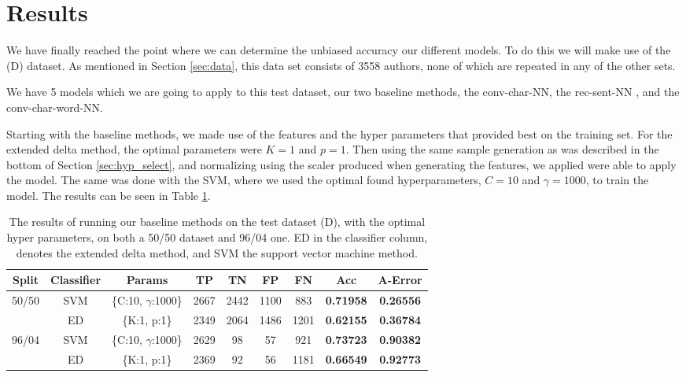 \section{Results} \label{sec:results}

We have finally reached the point where we can determine the unbiased accuracy
our different models. To do this we will make use of the (D) dataset. As
mentioned in Section \ref{sec:data}, this data set consists of 3558 authors,
none of which are repeated in any of the other sets.

We have 5 models which we are going to apply to this test dataset, our
two baseline methods, the \gls{conv-char-NN}, the \gls{rec-sent-NN} , and the
\gls{conv-char-word-NN}.

Starting with the baseline methods, we made use of the features and the
hyper parameters that provided best on the training set. For the extended
delta method, the optimal parameters were $K=1$ and $p = 1$. Then using
the same sample generation as was described in the bottom of Section
\ref{sec:hyp_select}, and normalizing using the scaler produced when
generating the features, we applied were able to apply the model. The same
was done with the \gls{SVM}, where we used the optimal found hyperparameters, $C=10$
and $\gamma = 1000$, to train the model. The results can be seen in Table
\ref{tab:baseline-res}.

\begin{table}[h]
\centering
\begin{tabular}{|c|c|c|c|c|c|c||c|c|}
\hline
Split & Classifier & Params & TP & TN & FP & FN & \textbf{Acc} & \textbf{A-Error} \\ \hline
\multirow{2}{*}{50/50} & SVM & \{C:10, $\gamma$:1000\} & 2667 & 2442 & 1100 & 883 & \textbf{0.71958} & \textbf{0.26556} \\ \cline{2-9} 
 & ED & \{K:1, p:1\} & 2349 & 2064 & 1486 & 1201 & \textbf{0.62155} & \textbf{0.36784} \\ \hline
\multirow{2}{*}{96/04} & SVM & \{C:10, $\gamma$:1000\} & 2629 & 98 & 57 & 921 & \textbf{0.73723} & \textbf{0.90382} \\ \cline{2-9} 
 & ED & \{K:1, p:1\} & 2369 & 92 & 56 & 1181 & \textbf{0.66549} & \textbf{0.92773} \\ \hline \end{tabular}
\caption{The results of running our baseline methods on the test dataset (D),
with the optimal hyper parameters, on both a 50/50 dataset and 96/04 one. ED in
the classifier column, denotes the extended delta method, and SVM the support
vector machine method.}
\label{tab:baseline-res}
\end{table}

